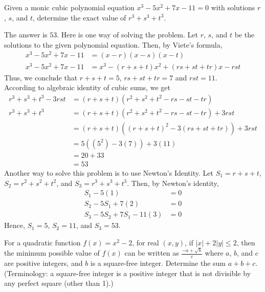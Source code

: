 \begin{problem}
Given a monic cubic polynomial equation $x^3-5x^2+7x-11=0$ with solutions $r$, $s$, and $t$, determine the exact value of $r^3+s^3+t^3$.
\end{problem}

\begin{solution}
The answer is $53$. Here is one way of solving the problem. Let $r$, $s$, and $t$ be the solutions to the given polynomial equation. Then, by Viete's formula,
	\begin{align*}
		x^3-5x^2+7x-11 &= (x-r)(x-s)(x-t)\\
		x^3-5x^2+7x-11 &= x^3-(r+s+t)x^2+(rs+st+tr)x-rst
	\end{align*}
	Thus, we conclude that $r+s+t=5$, $rs+st+tr=7$ and $rst=11$.\\
	\bigskip
	According to algebraic identity of cubic sums, we get
	\begin{align*}
	r^3+s^3+t^3-3rst &= (r+s+t)(r^2+s^2+t^2-rs-st-tr)\\
	r^3+s^3+t^3 &= (r+s+t)(r^2+s^2+t^2-rs-st-tr)+3rst\\
	&= (r+s+t)((r+s+t)^2-3(rs+st+tr))+3rst\\
	&=5((5^2)-3(7))+3(11)\\
	&=20+33\\
	&=53
	\end{align*}
	Another way to solve this problem is to use Newton's Identity. Let $S_1=r+s+t$, $S_2= r^2+s^2+t^2$, and $S_3=r^3+s^3+t^3$. Then, by Newton's identity,
	\begin{align*}
		S_1-5(1)&=0\\
		S_2-5S_1+7(2)&=0\\
		S_3-5S_2+7S_1-11(3)&=0
	\end{align*}
	Hence, $S_1=5$, $S_2=11$, and $S_3=53$.
\end{solution}

\begin{problem}
For a quadratic function $f(x)=x^2-2$, for real $(x,y)$, if $|x|+2|y|\leq2$, then the minimum possible value of $f(x)$ can be written as $\frac{-a+\sqrt{b}}{c}$ where $a$, $b$, and $c$ are positive integers, and $b$ is a square-free integer. Determine the sum $a+b+c$. (Terminology: a square-free integer is a positive integer that is not divisible by any perfect square (other than 1).)
\end{problem}

